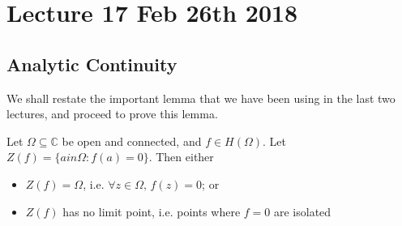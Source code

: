 \documentclass[notoc,notitlepage]{tufte-book}
\begin{document}

\chapter{Lecture 17 Feb 26th 2018}
	\label{chapter:lecture_17_feb_26th_2018}

\section{Analytic Continuity} %
\label{sec:analytic_continuity}

We shall restate the important lemma that we have been using in the last two lectures, and proceed to prove this lemma.

\begin{lemma*}\label{lemma*:principle_of_analytic_continuity}
	Let $\Omega \subseteq \mathbb{C}$ be open and connected, and $f \in H(\Omega)$. Let $Z(f) = \{a in \Omega : f(a) = 0 \}$. Then either
	\begin{itemize}
		\item $Z(f) = \Omega$, i.e. $\forall z \in \Omega, \, f(z) = 0$; or
		\item $Z(f)$ has no limit point, i.e. points where $f = 0$ are isolated
	\end{itemize}
\end{lemma*}
\end{document}
